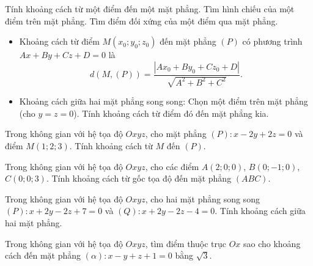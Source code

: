 
\begin{dang}{Tính khoảng cách từ một điểm đến một mặt phẳng. Tìm hình chiếu của một điểm trên mặt phẳng. Tìm điểm đối xứng của một điểm qua mặt phẳng.}
	\begin{itemize}
		\item Khoảng cách từ điểm $M(x_0;y_0;z_0)$ đến mặt phẳng $(P)$ có phương trình $Ax+By+Cz+D=0$ là $$d(M,(P))=\dfrac{|Ax_0+By_0+Cz_0+D|}{\sqrt{A^2+B^2+C^2}}.$$
		\item Khoảng cách giữa hai mặt phẳng song song: Chọn một điểm trên mặt phẳng (cho $y=z=0$). Tính khoảng cách từ điểm đó đến mặt phẳng kia.
	\end{itemize}
\end{dang}

\begin{vd}%
	Trong không gian với hệ tọa độ $Oxyz$, cho mặt phẳng $(P):x-2y+2z=0$ và điểm $M(1;2;3)$. Tính khoảng cách từ $M$ đến $(P)$.
\end{vd}

\begin{vd}%
	Trong không gian với hệ tọa độ $Oxyz$, cho các điểm $A(2;0;0)$, $B(0;-1;0)$, $C(0;0;3)$. Tính khoảng cách từ gốc tọa độ đến mặt phẳng $(ABC)$.
\end{vd}

\begin{vd}%
	Trong không gian với hệ tọa độ $Oxyz$, cho hai mặt phẳng song song $(P):x+2y-2z+7=0$ và $(Q):x+2y-2z-4=0$. Tính khoảng cách giữa hai mặt phẳng.
\end{vd}
\begin{vd}%
	Trong không gian với hệ tọa độ $Oxyz$, tìm điểm thuộc trục $Ox$ sao cho khoảng cách đến mặt phẳng $(\alpha):x-y+z+1=0$ bằng $\sqrt{3}$.
\end{vd}

